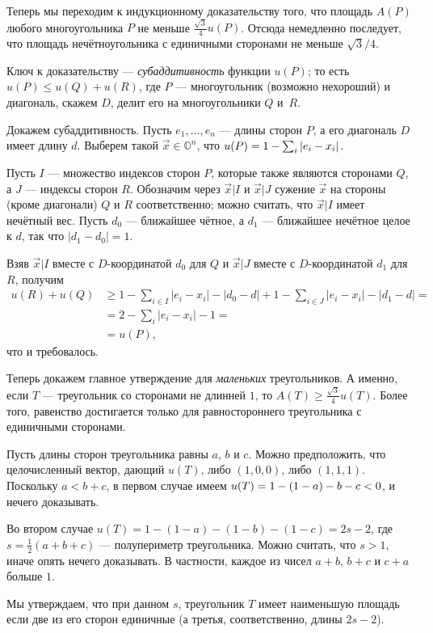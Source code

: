 Теперь мы переходим к индукционному доказательству того, что площадь $A(P)$ любого многоугольника $P$ не меньше $\tfrac{\sqrt{3}}{4}u(P)$.
Отсюда немедленно последует, что площадь нечётноугольника с единичными сторонами не меньше  $\sqrt{3}/4$.

Ключ к доказательству --- \emph{субаддитивность} функции $u(P)$;
то есть $u(P)\leqslant u(Q)+u(R)$, где $P$ --- многоугольник (возможно нехороший) и диагональ, скажем $D$, делит его на многоугольники $Q$ и~$R$.

Докажем субаддитивность.
Пусть  $e_1,\dots,e_n$ --- длины сторон $P$, а его диагональ $D$ имеет длину $d$. 
Выберем такой $\vec x\in\mathbb{O}^n$, что $u(P)\z=1-\sum_i |e_i-x_i|$.

Пусть $I$ --- множество индексов сторон $P$, которые также являются сторонами $Q$, а $J$ --- индексы сторон $R$.
Обозначим через $\vec x|I$ и $\vec x|J$ сужение $\vec x$ на стороны (кроме диагонали) $Q$ и $R$ соответственно;
можно считать, что $\vec x|I$ имеет нечётный вес.
Пусть $d_0$ --- ближайшее чётное, а $d_1$ --- ближайшее нечётное целое к $d$, так что $|d_1-d_0|=1$.

Взяв $\vec x|I$ вместе с $D$-координатой $d_0$ для $Q$ и 
$\vec x|J$ вместе с $D$-координатой $d_1$ для $R$, получим
\begin{align*}
u(R)+u(Q)
&\geqslant
1-\sum_{i\in I}|e_i-x_i|-|d_0-d|
+
1-\sum_{i\in J}|e_i-x_i|-|d_1-d|
=
\\
&=
2-\sum_{i}|e_i-x_i|-1=
\\
&=u(P),
\end{align*}
что и требовалось.

Теперь докажем главное утверждение для \emph{маленьких} треугольников.
А именно, если $T$ --- треугольник со сторонами не длинней $1$, то 
$A(T)\geqslant \tfrac{\sqrt{3}}{4}u(T)$.
Более того, равенство достигается только для равностороннего треугольника с единичными сторонами.

Пусть длины сторон треугольника равны $a$, $b$ и $c$.
Можно предположить, что целочисленный вектор, дающий $u(T)$, либо $(1, 0, 0)$, либо $(1, 1, 1)$.
Поскольку $a < b + c$, в первом случае имеем $u(T)\z=1-(1-a)-b-c<0$, и нечего доказывать.

Во втором случае
$u(T)=1-(1-a)-(1-b)-(1-c)=2s-2$, где $s=\tfrac12(a+b+c)$ --- полупериметр треугольника.
Можно считать, что $s > 1$, иначе опять нечего доказывать.
В частности, каждое из чисел $a+b$, $b+c$ и $c+a$ больше $1$.

Мы утверждаем, что при данном $s$, треугольник $T$ имеет наименьшую площадь если две из его сторон единичные (а третья, соответственно, длины $2s - 2$).

